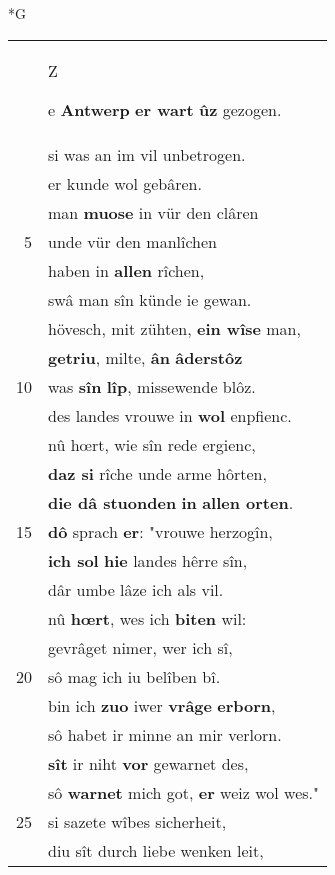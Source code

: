 \documentclass[8pt,a4paper,notitlepage]{article}
\begin{document}
\newpage
\begin{table}[ht]
\begin{minipage}[t]{0.5\linewidth}
\small
\begin{center}*G
\end{center}
\begin{tabular}{rl}
 & \begin{large}Z\end{large}e \textbf{Antwerp} \textbf{er wart} \textbf{ûz} gezogen.\\ 
 & si was an im vil unbetrogen.\\ 
 & er kunde wol gebâren.\\ 
 & man \textbf{muose} in vür den clâren\\ 
5 & unde vür den manlîchen\\ 
 & haben in \textbf{allen} rîchen,\\ 
 & swâ man sîn künde ie gewan.\\ 
 & hövesch, mit zühten, \textbf{ein wîse} man,\\ 
 & \textbf{getriu}, milte, \textbf{ân} \textbf{âderstôz}\\ 
10 & was \textbf{sîn} \textbf{lîp}, missewende blôz.\\ 
 & des landes vrouwe in \textbf{wol} enpfienc.\\ 
 & nû hœrt, wie sîn rede ergienc,\\ 
 & \textbf{daz si} rîche unde arme hôrten,\\ 
 & \textbf{die dâ stuonden} \textbf{in} \textbf{allen orten}.\\ 
15 & \textbf{dô} sprach \textbf{er}: "vrouwe herzogîn,\\ 
 & \textbf{ich sol} \textbf{hie} landes hêrre sîn,\\ 
 & dâr umbe lâze ich als vil.\\ 
 & nû \textbf{hœrt}, wes ich \textbf{biten} wil:\\ 
 & gevrâget nimer, wer ich sî,\\ 
20 & sô mag ich iu belîben bî.\\ 
 & bin ich \textbf{zuo} iwer \textbf{vrâge} \textbf{erborn},\\ 
 & sô habet ir minne an mir verlorn.\\ 
 & \textbf{sît} ir niht \textbf{vor} gewarnet des,\\ 
 & sô \textbf{warnet} mich got, \textbf{er} weiz wol wes."\\ 
25 & si sazete wîbes sicherheit,\\ 
 & diu sît durch liebe wenken leit,\\ 

\end{tabular}
\end{minipage}
\end{table}
\end{document}
